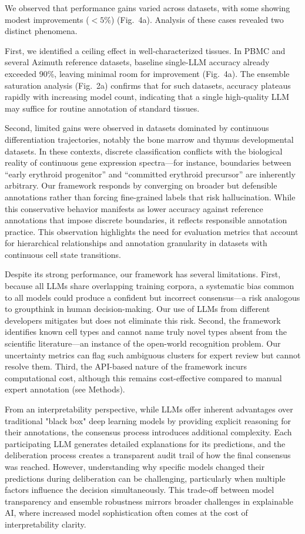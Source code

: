 \documentclass[pdflatex,sn-nature]{sn-jnl}%
\theoremstyle{thmstyleone}%
\theoremstyle{thmstyletwo}%
\theoremstyle{thmstylethree}%
\begin{document}
We observed that performance gains varied across datasets, with some showing modest improvements ($<5\%$) (Fig.~4a). Analysis of these cases revealed two distinct phenomena.

First, we identified a ceiling effect in well-characterized tissues. In PBMC and several Azimuth reference datasets, baseline single-LLM accuracy already exceeded 90\%, leaving minimal room for improvement (Fig.~4a). The ensemble saturation analysis (Fig.~2a) confirms that for such datasets, accuracy plateaus rapidly with increasing model count, indicating that a single high-quality LLM may suffice for routine annotation of standard tissues.

Second, limited gains were observed in datasets dominated by continuous differentiation trajectories, notably the bone marrow and thymus developmental datasets. In these contexts, discrete classification conflicts with the biological reality of continuous gene expression spectra---for instance, boundaries between ``early erythroid progenitor'' and ``committed erythroid precursor'' are inherently arbitrary. Our framework responds by converging on broader but defensible annotations rather than forcing fine-grained labels that risk hallucination. While this conservative behavior manifests as lower accuracy against reference annotations that impose discrete boundaries, it reflects responsible annotation practice. This observation highlights the need for evaluation metrics that account for hierarchical relationships and annotation granularity in datasets with continuous cell state transitions.

Despite its strong performance, our framework has several limitations. First, because all LLMs share overlapping training corpora, a systematic bias common to all models could produce a confident but incorrect consensus---a risk analogous to groupthink in human decision-making\cite{estornell2024multi}. Our use of LLMs from different developers mitigates but does not eliminate this risk. Second, the framework identifies known cell types and cannot name truly novel types absent from the scientific literature---an instance of the open-world recognition problem\cite{cao2022openworld}. Our uncertainty metrics can flag such ambiguous clusters for expert review but cannot resolve them. Third, the API-based nature of the framework incurs computational cost, although this remains cost-effective compared to manual expert annotation (see Methods).

From an interpretability perspective, while LLMs offer inherent advantages over traditional "black box" deep learning models\cite{rudin2019stop} by providing explicit reasoning for their annotations, the consensus process introduces additional complexity. Each participating LLM generates detailed explanations for its predictions, and the deliberation process creates a transparent audit trail of how the final consensus was reached. However, understanding why specific models changed their predictions during deliberation can be challenging, particularly when multiple factors influence the decision simultaneously. This trade-off between model transparency and ensemble robustness mirrors broader challenges in explainable AI, where increased model sophistication often comes at the cost of interpretability clarity.
\end{document}
